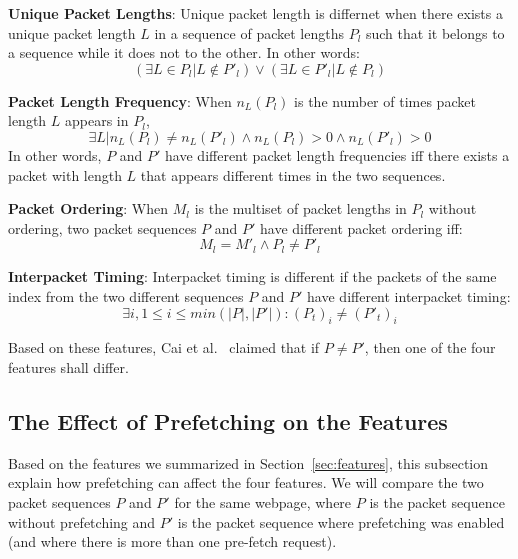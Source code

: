 {\bf Unique Packet Lengths}: 
Unique packet length is differnet when there exists a unique packet length $L$ in a sequence of packet lengths $P_l$ such that it belongs to a sequence while it does not to the other. In other words:
\begin{equation}
(\exists L \in P_l | L \notin P'_l ) \vee (\exists L \in P'_l | L \notin P_l)
\end{equation}

{\bf Packet Length Frequency}:
When $n_L(P_l)$ is the number of times packet length $L$ appears in $P_l$,
\begin{equation}
\exists L|n_L(P_l) \neq n_L(P'_l) \wedge n_L(P_l)>0 \wedge n_L(P'_l) >0
\end{equation}
In other words, $P$ and $P'$ have different packet length frequencies iff there exists a packet with length $L$ that appears different times in the two sequences.

{\bf Packet Ordering}:
When $M_l$ is the multiset of packet lengths in $P_l$ without ordering, two packet sequences $P$ and $P'$ have different packet ordering iff:
\begin{equation}
M_{ l }=M'_{ l }\wedge P_{ l }\neq P'_{ l }
\end{equation}

{\bf Interpacket Timing}:
Interpacket timing is different if the packets of the same index from the two different sequences $P$ and $P'$ have different interpacket timing:
\begin{equation}
\exists i, 1 \le i \le \mathit{min}(|P|, |P'|) : (P_t)_i \neq (P'_t)_i
\end{equation}

Based on these features, Cai et al.~\cite{Cai:2014kjb} claimed that if $P \neq P'$, then one of the four features shall differ.


\subsection{The Effect of Prefetching on the Features}

Based on the features we summarized in Section~\ref{sec:features}, this subsection explain how prefetching can affect the four features.
We will compare the two packet sequences $P$ and $P'$ for the same webpage, where $P$ is the packet sequence without prefetching and $P'$ is the packet sequence where prefetching was enabled (and where there is more than one pre-fetch request).

